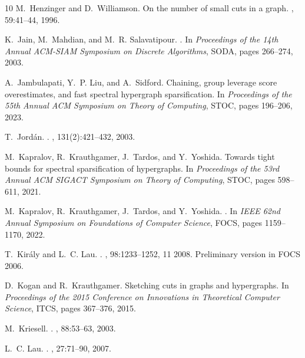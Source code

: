 \documentclass{article}
\begin{document}
\begin{thebibliography}{10}
M.~Henzinger and D.~Williamson.
\newblock On the number of small cuts in a graph.
, 59:41--44, 1996.

K.~Jain, M.~Mahdian, and M.~R. Salavatipour.
.
\newblock In {\em Proceedings of the 14th Annual ACM-SIAM Symposium on Discrete Algorithms}, SODA, pages 266--274, 2003.

A.~Jambulapati, Y.~P. Liu, and A.~Sidford.
\newblock Chaining, group leverage score overestimates, and fast spectral hypergraph sparsification.
\newblock In {\em Proceedings of the 55th Annual ACM Symposium on Theory of Computing}, STOC, pages 196--206, 2023.

T.~Jord\'{a}n.
.
, 131(2):421--432, 2003.

M.~Kapralov, R.~Krauthgamer, J.~Tardos, and Y.~Yoshida.
\newblock Towards tight bounds for spectral sparsification of hypergraphs.
\newblock In {\em Proceedings of the 53rd Annual ACM SIGACT Symposium on Theory of Computing}, STOC, pages 598--611, 2021.

M.~Kapralov, R.~Krauthgamer, J.~Tardos, and Y.~Yoshida.
.
\newblock In {\em IEEE 62nd Annual Symposium on Foundations of Computer Science}, FOCS, pages 1159--1170, 2022.

T.~Király and L.~C. Lau.
.
, 98:1233--1252, 11 2008.
\newblock Preliminary version in FOCS 2006.

D.~Kogan and R.~Krauthgamer.
\newblock Sketching cuts in graphs and hypergraphs.
\newblock In {\em Proceedings of the 2015 Conference on Innovations in Theoretical Computer Science}, ITCS, pages 367--376, 2015.

M.~Kriesell.
.
, 88:53--63, 2003.

L.~C. Lau.
.
, 27:71--90, 2007.


\end{thebibliography}
\end{document}
